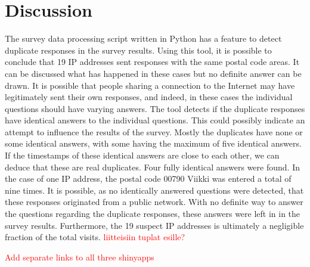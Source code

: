 \section{Discussion}
\justify


The survey data processing script written in Python has a feature to detect duplicate responses in the survey results. Using this tool, it is possible to conclude that 19 IP addresses sent responses with the same postal code areas. It can be discussed what has happened in these cases but no definite answer can be drawn. It is possible that people sharing a connection to the Internet may have legitimately sent their own responses, and indeed, in these cases the individual questions should have varying answers. The tool detects if the duplicate responses have identical answers to the individual questions. This could possibly indicate an attempt to influence the results of the survey. Mostly the duplicates have none or some identical answers, with some having the maximum of five identical answers. If the timestamps of these identical answers are close to each other, we can deduce that these are real duplicates. Four fully identical answers were found. In the case of one IP address, the postal code 00790 Viikki was entered a total of nine times. It is possible, as no identically answered questions were detected, that these responses originated from a public network. With no definite way to answer the questions regarding the duplicate responses, these answers were left in in the survey results. Furthermore, the 19 suspect IP addresses is ultimately a negligible fraction of the total visits. \textcolor{red}{liitteisiin tuplat esille?}

\textcolor{red}{Add separate links to all three shinyapps}